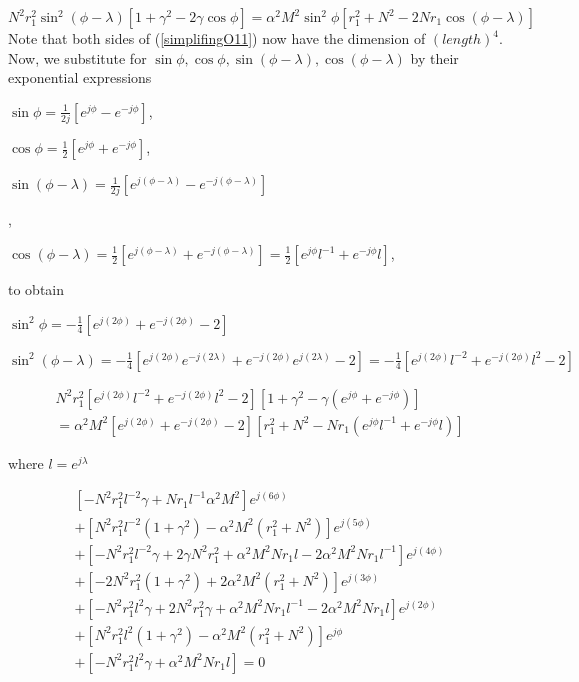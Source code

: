 \begin{equation}
N^2 r_1^2 \sin^2(\phi-\lambda) [1+\gamma^2 - 2\gamma \cos\phi] 
= \alpha^2 M^2 \sin^2\phi[r_1^2 + N^2 - 2N r_1 \cos(\phi-\lambda)]
\label{simplifingO11}
\end{equation} 
Note that both sides of (\ref{simplifingO11}) now have the dimension of $(length)^4$. 
Now, we substitute for $\sin\phi, \cos\phi, \sin(\phi-\lambda), \cos(\phi-\lambda)$ by their exponential expressions 
\begin{center}
$\sin\phi=\frac{1}{2j}[e^{j\phi}-e^{-j\phi}]$,
\end{center}
\begin{center}
$\cos\phi=\frac{1}{2}[e^{j\phi}+e^{-j\phi}]$,
\end{center}
\begin{center}
$\sin(\phi-\lambda)=\frac{1}{2j}[e^{j(\phi-\lambda)}-e^{-j(\phi-\lambda)}]$
\end{center}, 
\begin{center}
$\cos(\phi-\lambda)=\frac{1}{2}[e^{j(\phi-\lambda)}+e^{-j(\phi-\lambda)}]= \frac{1}{2}[e^{j\phi}l^{-1}+e^{-j \phi}l]$,
\end{center} 

to obtain\\
\begin{center}
$\sin^2\phi= - \frac{1}{4}[e^{j(2\phi)}+e^{-j(2\phi)}-2]$
\end{center}
\begin{center}
$\sin^2(\phi-\lambda)= - \frac{1}{4}[e^{j(2\phi)}e^{-j(2\lambda)}+e^{-j(2\phi)}e^{j(2\lambda)}-2]=-\frac{1}{4}[e^{j(2\phi)}l^{-2} + e^{-j(2\phi)}l^2-2]$
\end{center}

\begin{equation}
\begin{split}
N^2 r_1^2 [e^{j(2\phi)}l^{-2}+e^{-j(2\phi)}l^2-2][1+\gamma^2 - \gamma(e^{j\phi}+e^{-j\phi})]\\
=\alpha^2 M^2 [e^{j(2\phi)}+e^{-j(2\phi)}-2][r_1^2 + N^2 - N r_1 (e^{j\phi} l^{-1} + e^{-j\phi}l)]
\label{6-14}
\end{split}
\end{equation}

where $l=e^{j\lambda}$


\begin{equation}
\begin{split}
[-N^2 r_1^2 l^{-2} \gamma + N r_1 l^{-1} \alpha^2 M^2]e^{j(6\phi)}\\
+[N^2 r_1^2 l^{-2} (1+\gamma^2)-\alpha^2 M^2 (r_1^2+N^2)]e^{j(5\phi)}\\
+[-N^2 r_1^2 l^{-2} \gamma + 2\gamma N^2 r_1^2 +\alpha^2 M^2 N r_1 l-2\alpha^2 M^2 N r_1 l^{-1}]e^{j(4\phi)}\\
+[-2N^2 r_1^2 (1+\gamma^2)+ 2\alpha^2 M^2 (r_1^2+N^2)]e^{j(3\phi)}\\
+[-N^2 r_1^2 l^2 \gamma + 2 N^2 r_1^2 \gamma + \alpha^2 M^2 N r_1 l^{-1}- 2 \alpha^2 M^2 N r_1 l]e^{j(2\phi)}\\
+[N^2 r_1^2 l^2 (1+\gamma^2)-\alpha^2 M^2 (r_1^2 + N^2)]e^{j\phi}\\
+[-N^2 r_1^2 l^2 \gamma + \alpha^2 M^2 N r_1 l]=0
\end{split}
\label{fform}
\end{equation}

